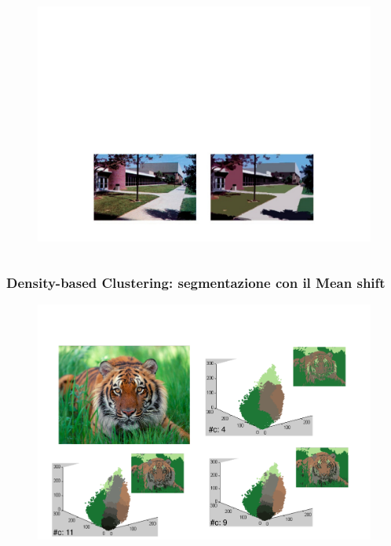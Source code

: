 \begin{frame}
\begin{columns}
			\begin{figure}[!htbp]
				\centering
				\includegraphics[width=0.8\linewidth]{images/unsupervised/non_parametric/mean_shift_result_2.pdf}
			\end{figure}

		\end{columns}

\end{frame}


\begin{frame}

	\frametitle{{\color{GradientDescentDiagramRed}Density-based Clustering}: segmentazione con il Mean shift}

		\begin{figure}[!htbp]
				\centering
				\includegraphics[angle=0,width=0.95\linewidth]{images/unsupervised/non_parametric/meanshift_lion.pdf}
			\end{figure}

\end{frame}


